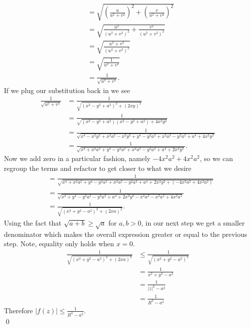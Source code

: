 \documentclass[10pt]{amsart}
\theoremstyle{nonumberplain}
\begin{document}
\begin{enumerate}[label={\bf {\arabic*}:}]
\begin{align*}
	&= \sqrt{
		\left(\frac{u }{u^2 + v^2 }\right)^2 + \left(\frac{v }{u^2 + v^2 }\right)^2
	} \\
	&= \sqrt{
		\frac{u^2 }{\left( u^2 + v^2 \right)^2} + \frac{v^2 }{\left( u^2 + v^2 \right)^2}
	} \\
	&= \sqrt{
		\frac{u^2 + v^2 }{\left( u^2 + v^2 \right)^2}
	} \\
	&= \sqrt{
		\frac{1}{u^2 + v^2}
	} \\
	&= \frac{1}{\sqrt{u^2 + v^2}}.
\end{align*}
If we plug our substitution back in we see
\begin{align*}
\frac{1}{\sqrt{u^2 + v^2}} &= \frac{1}{\sqrt{\left(x^2 - y^2 + a^2 \right)^2 + \left(2xy \right)^2}} \\
	&= \frac{1}{\sqrt{\left(x^2 - y^2 + a^2 \right)\left(x^2 - y^2 + a^2 \right) + 4x^2y^2}} \\
	&= \frac{1}{
		\sqrt{
			x^4 - x^2y^2 + x^2a^2 -x^2y^2 + y^4 - y^2a^2 + x^2a^2 - y^2a^2 + a^4 + 4x^2y^2
		}
	} \\
	&= \frac{1}{
		\sqrt{
			x^4 + x^2a^2 + y^4 - y^2a^2 + x^2a^2 - y^2a^2 + a^4 + 2x^2y^2
		}
	}.
\end{align*}
Now we add zero in a particular fashion, namely $- 4x^2a^2 + 4x^2a^2 $, so we can regroup the terms and refactor to get closer to what we desire
\begin{align*}
	&= \frac{1}{
		\sqrt{
			x^4 + x^2a^2 + y^4 - y^2a^2 + x^2a^2 - y^2a^2 + a^4 + 2x^2y^2 +\left( - 4x^2a^2 + 4x^2a^2 \right)
		}
	} \\
	&= \frac{1}{
		\sqrt{
			x^4 + y^4 - y^2a^2 - y^2a^2 + a^4 + 2x^2y^2 - x^2a^2 - x^2a^2 + 4x^2a^2
		}
	} \\
	&= \frac{1}{\sqrt{\left(x^2 + y^2 - a^2\right)^2 + \left(2xa\right)^2}}.
\end{align*}
Using the fact that $\sqrt{a + b} \geq \sqrt{a}$ for $a, b > 0$, in our next step we get a smaller denominator which makes the overall expression greater or equal to the previous step. Note, equality only holds when $x=0$.
\begin{align*}
 \frac{1}{\sqrt{\left(x^2 + y^2 - a^2\right)^2 + \left(2xa\right)^2}}
 	&\leq \frac{1}{\sqrt{\left(x^2 + y^2 - a^2\right)^2}} \\
	&= \frac{1}{x^2 + y^2 - a^2} \\
	&= \frac{1}{|z|^2 - a^2} \\
	&= \frac{1}{R^2 - a^2}
\end{align*}
Therefore $\left| f(z) \right| \leq \frac{1}{R^2 - a^2}$. \\
\qed


\end{enumerate}
\end{document}
